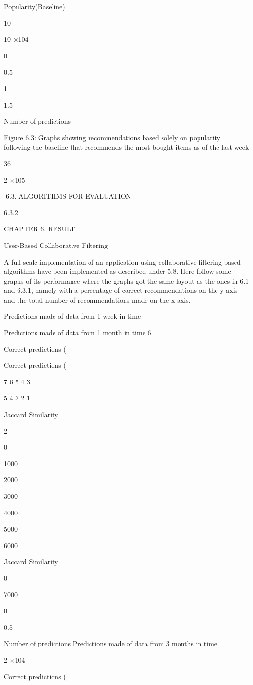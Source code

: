 Popularity(Baseline)

10

10
×104

0

0.5

1

1.5

Number of predictions

Figure 6.3: Graphs showing recommendations based solely on popularity following the
baseline that recommends the most bought items as of the last week

36

2
×105

6.3. ALGORITHMS FOR EVALUATION

6.3.2

CHAPTER 6. RESULT

User-Based Collaborative Filtering

A full-scale implementation of an application using collaborative filtering-based algorithms have been implemented as described under 5.8. Here follow some graphs of its
performance where the graphs got the same layout as the ones in 6.1 and 6.3.1, namely
with a percentage of correct recommendations on the y-axis and the total number of
recommendations made on the x-axis.

Predictions made of data from 1 week in time

Predictions made of data from 1 month in time
6

Correct predictions (%

Correct predictions (%

7
6
5
4
3

5
4
3
2
1

Jaccard Similarity

2

0

1000

2000

3000

4000

5000

6000

Jaccard Similarity

0

7000

0

0.5

Number of predictions
Predictions made of data from 3 months in time

2
×104

Correct predictions (%

